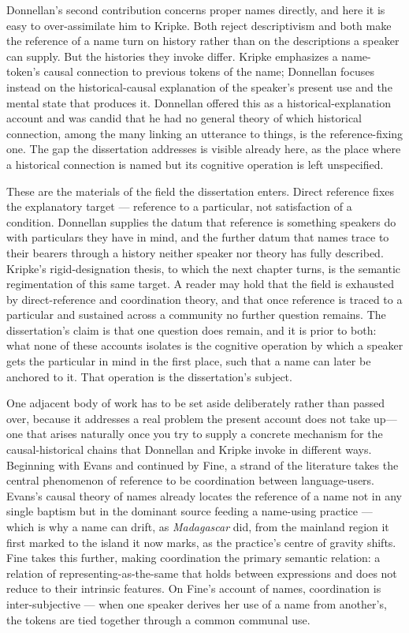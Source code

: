 \documentclass[12pt,a4paper]{article}
\begin{document}
Donnellan's second contribution concerns proper names directly, and here it is easy to over-assimilate him to Kripke. Both reject descriptivism and both make the reference of a name turn on history rather than on the descriptions a speaker can supply. But the histories they invoke differ. Kripke emphasizes a name-token's causal connection to previous tokens of the name; Donnellan focuses instead on the historical-causal explanation of the speaker's present use and the mental state that produces it. Donnellan offered this as a historical-explanation account and was candid that he had no general theory of which historical connection, among the many linking an utterance to things, is the reference-fixing one. The gap the dissertation addresses is visible already here, as the place where a historical connection is named but its cognitive operation is left unspecified.

These are the materials of the field the dissertation enters. Direct reference fixes the explanatory target --- reference to a particular, not satisfaction of a condition. Donnellan supplies the datum that reference is something speakers do with particulars they have in mind, and the further datum that names trace to their bearers through a history neither speaker nor theory has fully described. Kripke's rigid-designation thesis, to which the next chapter turns, is the semantic regimentation of this same target. A reader may hold that the field is exhausted by direct-reference and coordination theory, and that once reference is traced to a particular and sustained across a community no further question remains. The dissertation's claim is that one question does remain, and it is prior to both: what none of these accounts isolates is the cognitive operation by which a speaker gets the particular in mind in the first place, such that a name can later be anchored to it. That operation is the dissertation's subject.

One adjacent body of work has to be set aside deliberately rather than passed over, because it addresses a real problem the present account does not take up---one that arises naturally once you try to supply a concrete mechanism for the causal-historical chains that Donnellan and Kripke invoke in different ways. Beginning with Evans and continued by Fine, a strand of the literature takes the central phenomenon of reference to be coordination between language-users. Evans's causal theory of names already locates the reference of a name not in any single baptism but in the dominant source feeding a name-using practice --- which is why a name can drift, as \emph{Madagascar} did, from the mainland region it first marked to the island it now marks, as the practice's centre of gravity shifts. Fine takes this further, making coordination the primary semantic relation: a relation of representing-as-the-same that holds between expressions and does not reduce to their intrinsic features. On Fine's account of names, coordination is inter-subjective --- when one speaker derives her use of a name from another's, the tokens are tied together through a common communal use.
\end{document}
